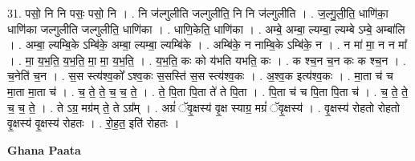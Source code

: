 \documentclass[17pt]{extarticle}
\begin{document}
31. पसो॒ नि नि पसः॒ पसो॒ नि । . नि ज॑ल्गुलीति जल्गुलीति॒ नि नि ज॑ल्गुलीति । . ज॒ल्गु॒ली॒ति॒ धाणि॑का॒ धाणि॑का जल्गुलीति जल्गुलीति॒ धाणि॑का । . धाणि॒केति॒ धाणि॑का । . अम्बे॒ अम्बा॒ ल्यम्बा॒ ल्यम्बे ऽम्बे॒ अम्बा॑लि । . अम्बा॒ ल्यम्बि॒के ऽम्बि॑के॒ अम्बा॒ ल्यम्बा॒ ल्यम्बि॑के । . अम्बि॑के॒ न नाम्बि॒के ऽम्बि॑के॒ न । . न मा॑ मा॒ न न मा᳚ । . मा॒ य॒भ॒ति॒ य॒भ॒ति॒ मा॒ मा॒ य॒भ॒ति॒ । . य॒भ॒ति॒ कः को य॑भति यभति॒ कः । . क श्च॒न च॒न कः क श्च॒न । . च॒नेति॑ च॒न । . स॒स स्त्य॑श्व॒को᳚ ऽश्व॒कः स॒सस्ति॑ स॒स स्त्य॑श्व॒कः । . अ॒श्व॒क इत्य॑श्व॒कः । . मा॒ता च॑ च मा॒ता मा॒ता च॑ । . च॒ ते॒ ते॒ च॒ च॒ ते॒ । . ते॒ पि॒ता पि॒ता ते॑ ते पि॒ता । . पि॒ता च॑ च पि॒ता पि॒ता च॑ । . च॒ ते॒ ते॒ च॒ च॒ ते॒ । . ते ऽग्र॒ मग्र॑म् ते॒ ते ऽग्र᳚म् । . अग्रं॑ ॅवृ॒क्षस्य॑ वृ॒क्ष स्याग्र॒ मग्रं॑ ॅवृ॒क्षस्य॑ । . वृ॒क्षस्य॑ रोहतो रोहतो वृ॒क्षस्य॑ वृ॒क्षस्य॑ रोहतः । . रो॒ह॒त॒ इति॑ रोहतः । \newline

\textbf{Ghana Paata } \newline
\end{document}
